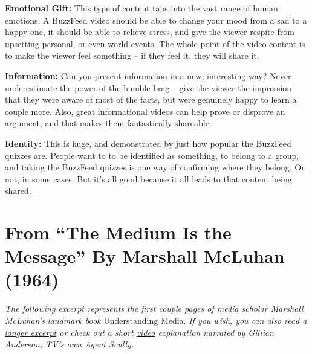 \documentclass[]{book}
\theoremstyle{definition}
\theoremstyle{definition}
\theoremstyle{definition}
\theoremstyle{remark}
\begin{document}
\textbf{Emotional Gift:} This type of content taps into the vast range
of human emotions. A BuzzFeed video should be able to change your mood
from a sad to a happy one, it should be able to relieve stress, and give
the viewer respite from upsetting personal, or even world events. The
whole point of the video content is to make the viewer feel something --
if they feel it, they will share it.

\textbf{Information:} Can you present information in a new, interesting
way? Never underestimate the power of the humble brag -- give the viewer
the impression that they were aware of most of the facts, but were
genuinely happy to learn a couple more. Also, great informational videos
can help prove or disprove an argument, and that makes them
fantastically shareable.

\textbf{Identity:} This is huge, and demonstrated by just how popular
the BuzzFeed quizzes are. People want to to be identified as something,
to belong to a group, and taking the BuzzFeed quizzes is one way of
confirming where they belong. Or not, in some cases. But it's all good
because it all leads to that content being shared.

\hypertarget{from-the-medium-is-the-message-by-marshall-mcluhan-1964}{%
\section{From ``The Medium Is the Message'' By Marshall McLuhan
(1964)}\label{from-the-medium-is-the-message-by-marshall-mcluhan-1964}}

\emph{The following excerpt represents the first couple pages of media
scholar Marshall McLuhan's landmark book} Understanding Media. \emph{If
you wish, you can also read a
\href{http://web.mit.edu/allanmc/www/mcluhan.mediummessage.pdf}{longer
excerpt} or check out a short
\href{https://www.youtube.com/watch?v=Ko6J9v1C9zE}{video} explanation
narrated by Gillian Anderson, TV's own Agent Scully.}
\end{document}
